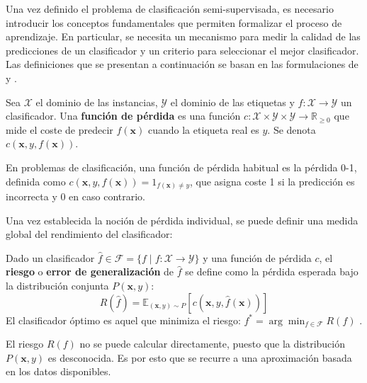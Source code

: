 Una vez definido el problema de clasificación semi-supervisada, es necesario introducir los conceptos fundamentales que permiten formalizar el proceso de aprendizaje. En particular, se necesita un mecanismo para medir la calidad de las predicciones de un clasificador y un criterio para seleccionar el mejor clasificador. Las definiciones que se presentan a continuación se basan en las formulaciones de \citet{zhu2009introduction} y \citet{mohri2018foundations}.

\begin{defi}
\label{def:perdida}
Sea $\mathcal{X}$ el dominio de las instancias, $\mathcal{Y}$ el dominio de las etiquetas y $f: \mathcal{X} \to \mathcal{Y}$ un clasificador. Una \textbf{función de pérdida} es una función $c: \mathcal{X} \times \mathcal{Y} \times \mathcal{Y} \to \mathbb{R}_{\geq 0}$ que mide el coste de predecir $f(\mathbf{x})$ cuando la etiqueta real es $y$. Se denota $c(\mathbf{x}, y, f(\mathbf{x}))$.
\end{defi}

\begin{example}
En problemas de clasificación, una función de pérdida habitual es la pérdida 0-1, definida como $c(\mathbf{x}, y, f(\mathbf{x})) = 1_{f(\mathbf{x}) \neq y}$, que asigna coste 1 si la predicción es incorrecta y 0 en caso contrario.
\end{example}

Una vez establecida la noción de pérdida individual, se puede definir una medida global del rendimiento del clasificador:

\begin{defi}[Riesgo]
\label{def:riesgo}
Dado un clasificador $\hat{f} \in \mathcal{F} = \{f \mid f: \mathcal{X} \to \mathcal{Y} \}$ y una función de pérdida $c$, el \textbf{riesgo} o \textbf{error de generalización} de $\hat{f}$ se define como la pérdida esperada bajo la distribución conjunta $P(\mathbf{x}, y)$:
$$R(\hat{f}) = \mathbb{E}_{(\mathbf{x},y) \sim P}\left[c(\mathbf{x}, y, \hat{f}(\mathbf{x}))\right]$$
El clasificador óptimo es aquel que minimiza el riesgo: $f^* = \arg\min_{f \in \mathcal{F}} R(f)$ \cite{zhu2009introduction}.
\end{defi}

\begin{rema}
El riesgo $R(f)$ no se puede calcular directamente, puesto que la distribución $P(\mathbf{x}, y)$ es desconocida. Es por esto que se recurre a una aproximación basada en los datos disponibles.
\end{rema}

